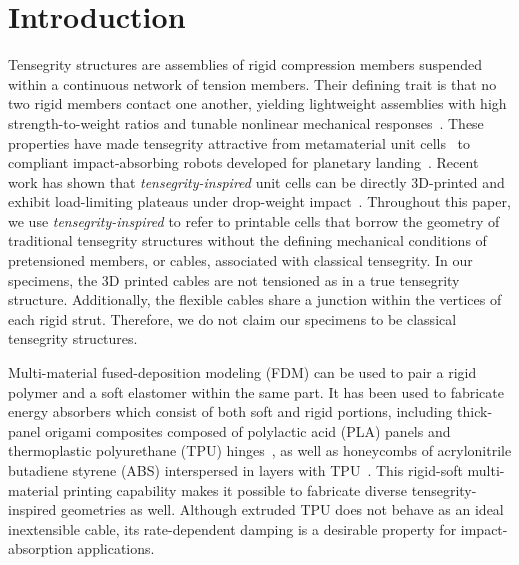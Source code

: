 \documentclass[11pt]{article}
\begin{document}
\section{Introduction}
\label{sec:introduction}

Tensegrity structures are assemblies of rigid compression members
suspended within a continuous network of tension members. Their defining
trait is that no two rigid members contact one another, yielding lightweight assemblies with
high strength-to-weight ratios and tunable nonlinear mechanical
responses~\citep{skelton2009tensegrity, sultan2009tensegrity}. These
properties have made tensegrity attractive from
metamaterial unit cells~\citep{amendola2014experimental,
zhang2018tensegrity, fraternali2015tensegrity} to compliant impact-absorbing
robots developed for planetary landing~\citep{agogino2018superball,
caluwaerts2014superball, sabelhaus2015system, vespignani2018design,
deitrich2022titan}. Recent work has shown that \emph{tensegrity-inspired}
unit cells can be directly 3D-printed and exhibit load-limiting plateaus
under drop-weight impact~\citep{pajunen2019design}. Throughout this paper,
we use \emph{tensegrity-inspired} to refer to printable cells that borrow
the geometry of traditional tensegrity structures without the defining
mechanical conditions of pretensioned members, or cables, associated
with classical tensegrity. In our specimens, the 3D printed cables are
not tensioned as in a true tensegrity structure. Additionally, the
flexible cables share a junction within the vertices of each rigid
strut. Therefore, we do not claim our specimens to be classical
tensegrity structures.

Multi-material fused-deposition modeling (FDM) can be used to pair a
rigid polymer and a soft elastomer within the same part. It has been
used to fabricate energy absorbers which consist of both soft and rigid
portions, including thick-panel origami composites composed of
polylactic acid (PLA) panels and thermoplastic polyurethane (TPU)
hinges~\citep{ye2023multimaterial}, as well as honeycombs of
acrylonitrile butadiene styrene (ABS) interspersed in layers with
TPU~\citep{khatri2024energy}. This rigid-soft multi-material printing
capability makes it possible to fabricate diverse tensegrity-inspired
geometries as well. Although extruded TPU does not behave as an ideal
inextensible cable, its rate-dependent damping is a desirable property
for impact-absorption applications.
\end{document}
